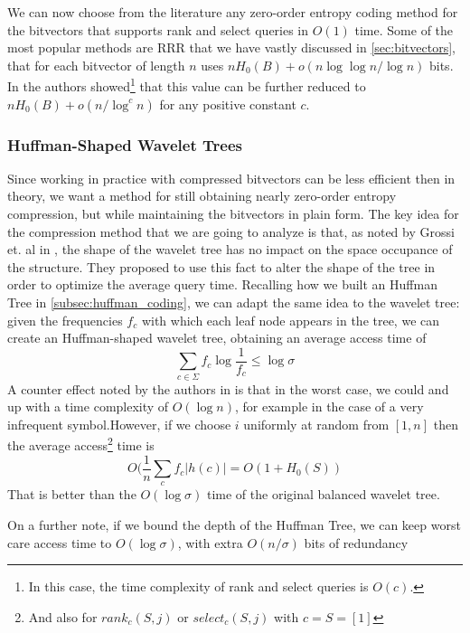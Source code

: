 \noindent We can now choose from the literature any zero-order entropy coding method for the bitvectors that supports rank and select queries in $O(1)$ time. Some of the most popular methods are RRR \cite{RRR2002} that we have vastly discussed in \autoref{sec:bitvectors}, that for each bitvector of length $n$ uses $n H_0(B) + o(n \log \log n / \log n)$ bits. In \cite{patrascu2008succincter} the authors showed\footnote{In this case, the time complexity of rank and select queries is $O(c)$.} that this value can be further reduced to $n H_0(B) + o(n/\log^c n)$ for any positive constant $c$.

\subsubsection{Huffman-Shaped Wavelet Trees}
Since working in practice with compressed bitvectors can be less efficient then in theory, we want a method for still obtaining nearly zero-order entropy compression, but while maintaining the bitvectors in plain form. The key idea for the compression method that we are going to analyze is that, as noted by Grossi et. al in \cite{grossi2004indexing}, the shape of the wavelet tree has no impact on the space occupance of the structure. They proposed to use this fact to alter the shape of the tree in order to optimize the average query time. Recalling how we built an Huffman Tree in \ref{subsec:huffman_coding}, we can adapt the same idea to the wavelet tree: given the frequencies $f_c$ with which each leaf node appears in the tree, we can create an Huffman-shaped wavelet tree, obtaining an average access time of
\begin{equation}
    \sum_{c \in \Sigma} f_c \log \frac{1}{f_c} \leq \log \sigma
\end{equation}
A counter effect noted by the authors in \cite{grossi2004indexing} is that in the worst case, we could and up with a time complexity of $O(\log n)$, for example in the case of a very infrequent symbol.However, if we choose $i$ uniformly at random from $[1, n]$ then the average access\footnote{And also for $rank_c(S,j)$ or $select_c(S,j)$ with $c = S=[1]$} time is
\begin{equation}
    O(\frac{1}{n} \sum_c f_c |h(c)| = O(1 + H_0(S))
\end{equation}
That is better than the $O(\log \sigma)$ time of the original balanced wavelet tree.

\begin{remark}
    On a further note, if we bound the depth of the Huffman Tree, we can keep worst care access time to $O(\log \sigma)$, with extra $O(n/\sigma)$ bits of redundancy
\end{remark}

